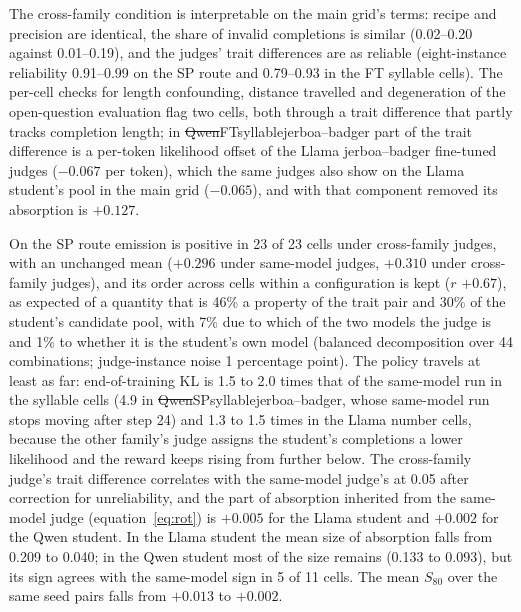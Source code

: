 
The cross-family condition is interpretable on the main grid's terms: recipe and precision are identical, the share of invalid completions is similar (0.02--0.20 against 0.01--0.19), and the judges' trait differences are as reliable (eight-instance reliability 0.91--0.99 on the SP route and 0.79--0.93 in the FT syllable cells). The per-cell checks for length confounding, distance travelled and degeneration of the open-question evaluation flag two cells, both through a trait difference that partly tracks completion length; in \st{Qwen}{FT}{syllable}{jerboa--badger} part of the trait difference is a per-token likelihood offset of the Llama jerboa--badger fine-tuned judges ($-0.067$ per token), which the same judges also show on the Llama student's pool in the main grid ($-0.065$), and with that component removed its absorption is $+0.127$.

On the SP route emission is positive in 23 of 23 cells under cross-family judges, with an unchanged mean ($+0.296$ under same-model judges, $+0.310$ under cross-family judges), and its order across cells within a configuration is kept ($r$ $+0.67$), as expected of a quantity that is 46\% a property of the trait pair and 30\% of the student's candidate pool, with 7\% due to which of the two models the judge is and 1\% to whether it is the student's own model (balanced decomposition over 44 combinations; judge-instance noise 1 percentage point). The policy travels at least as far: end-of-training KL is 1.5 to 2.0 times that of the same-model run in the syllable cells (4.9 in \st{Qwen}{SP}{syllable}{jerboa--badger}, whose same-model run stops moving after step 24) and 1.3 to 1.5 times in the Llama number cells, because the other family's judge assigns the student's completions a lower likelihood and the reward keeps rising from further below. The cross-family judge's trait difference correlates with the same-model judge's at 0.05 after correction for unreliability, and the part of absorption inherited from the same-model judge (equation~\eqref{eq:rot}) is $+0.005$ for the Llama student and $+0.002$ for the Qwen student. In the Llama student the mean size of absorption falls from 0.209 to 0.040; in the Qwen student most of the size remains (0.133 to 0.093), but its sign agrees with the same-model sign in 5 of 11 cells. The mean $S_{80}$ over the same seed pairs falls from $+0.013$ to $+0.002$.

